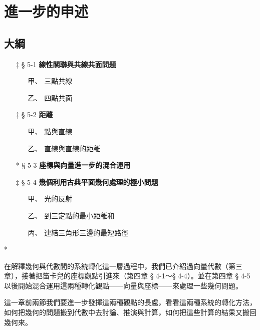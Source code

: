 \section{進一步的申述}
\label{sec:b3_ch5}

\renewcommand{\thefigure}{5-\arabic{figure}}
\setcounter{figure}{0}

\subsection*{大綱}

\begin{itemize}[leftmargin=2em]
  \item[$\ddagger$ § 5-1] \textbf{線性關聯與共線共面問題}
  \begin{itemize}[leftmargin=2em]
    \item[甲、] 三點共線
    \item[乙、] 四點共面
  \end{itemize}
  \item[$\ddagger$ § 5-2] \textbf{距離}
  \begin{itemize}[leftmargin=2em]
    \item[甲、] 點與直線
    \item[乙、] 直線與直線的距離
  \end{itemize}
  \item[* § 5-3] \textbf{座標與向量進一步的混合運用}
  \item[$\ddagger$ § 5-4] \textbf{幾個利用古典平面幾何處理的極小問題}
  \begin{itemize}[leftmargin=2em]
    \item[甲、] 光的反射
    \item[乙、] 到三定點的最小距離和
    \item[丙、] 連結三角形三邊的最短路徑
  \end{itemize}
\end{itemize}

\begin{center}
* \qquad * \qquad * \qquad * \qquad *
\end{center}

在解釋幾何與代數間的系統轉化這一層過程中，我們已介紹過向量代數（第三章），接著把笛卡兒的座標觀點引進來（第四章 § 4-1～§ 4-4）。並在第四章 § 4-5 以後開始混合運用這兩種轉化觀點——向量與座標——來處理一些幾何問題。

這一章前兩節我們要進一步發揮這兩種觀點的長處，看看這兩種系統的轉化方法，如何把幾何的問題搬到代數中去討論、推演與計算，如何把這些計算的結果又搬回幾何來。

